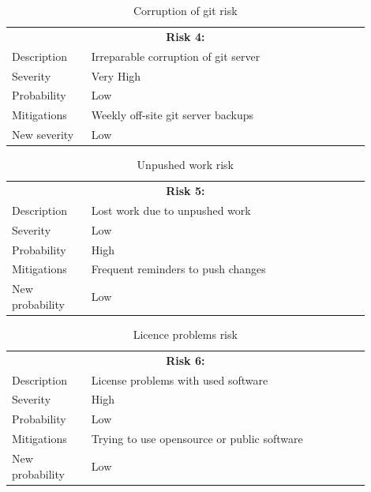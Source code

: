 \newpage

\begin{table}[H]
  \centering
  \begin{tabular}{|p{0.2\linewidth}p{0.7\linewidth}|}
    \hline
    \multicolumn{2}{|c|}{\textbf{Risk 4:}} \\
    Description     & Irreparable corruption of git server           \\
    Severity        & Very High                                 \\
    Probability     & Low                                   \\
    Mitigations     & Weekly off-site git server backups  \\
    New severity    & Low      \\
    \hline                             
  \end{tabular}
  \caption{Corruption of git risk}
\end{table}

\vspace{2.5cm}

\begin{table}[H]
  \centering
  \begin{tabular}{|p{0.2\linewidth}p{0.7\linewidth}|}
    \hline
    \multicolumn{2}{|c|}{\textbf{Risk 5:}} \\
    Description     & Lost work due to unpushed work           \\
    Severity        & Low                                 \\
    Probability     & High                                   \\
    Mitigations     & Frequent reminders to push changes  \\
    New probability & Low   \\
    \hline                                
  \end{tabular}
  \caption{Unpushed work risk}
\end{table}

\vspace{2.5cm}

\begin{table}[H]
  \centering
  \begin{tabular}{|p{0.2\linewidth}p{0.7\linewidth}|}
    \hline
    \multicolumn{2}{|c|}{\textbf{Risk 6:}} \\
    Description     & License problems with used software           \\
    Severity        & High                                 \\
    Probability     & Low                                   \\
    Mitigations     & Trying to use opensource or public software  \\
    New probability & Low       \\
    \hline                            
  \end{tabular}
  \caption{Licence problems risk}
\end{table}
